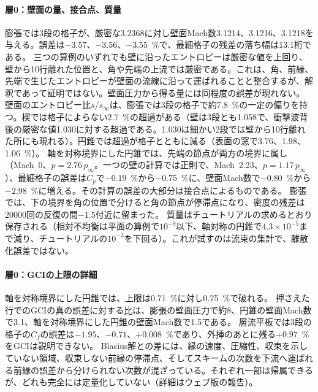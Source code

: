\documentclass[twocolumn]{labreport}
\newcommand{\Cp}{C_p}
\newcommand{\pinf}{p_\infty}
\begin{document}
\paragraph{層0：壁面の量、接合点、質量}
膨張では3段の格子が、厳密な3.2368に対し壁面Mach数3.1214、3.1216、3.1218を与える。誤差は$-3.57$、$-3.56$、$-3.55$~\%で、最細格子の残差の落ち幅は13.1桁である。
三つの算例のいずれでも壁に沿ったエントロピーは厳密な値を上回り、壁から10行離れた位置と、角や先端の上流では厳密である。これは、角、前縁、先端で生じたエントロピーが壁面の流線に沿って運ばれることと整合するが、解釈であって証明ではない。壁面圧力から得る量には同程度の誤差が現れない。
壁面のエントロピー比$s/s_\infty$は、膨張では3段の格子で約7.8~\%の一定の偏りを持つ。楔では格子によらない2.7~\%の超過がある（壁は3段とも1.058で、衝撃波背後の厳密な値1.030に対する超過である。1.030は細かい2段では壁から10行離れた所にも現れる）。円錐では超過が格子とともに減る（表面の窓で3.76、1.98、1.06~\%）。
軸を対称境界にした円錐では、先端の節点が両方の境界に属し（Mach~0、$p=2.76\,\pinf$。一つの壁の計算では正則で、Mach~2.23、$p=1.17\,\pinf$）、最細格子の誤差は$\Cp$で$-0.19$~\%から$-0.75$~\%に、壁面Mach数で$-0.80$~\%から$-2.98$~\%に増える。その計算の誤差の大部分は接合点によるものである。
膨張では、下の境界を角の位置で分けると角の節点が停滞点になり、密度の残差は20000回の反復の間$-1.5$付近に留まった。
質量はチュートリアルの求めるとおり保存される（相対不均衡は平面の算例で$10^{-9}$以下、軸対称の円錐で$4.3\times10^{-5}$まで減り、チュートリアルの$10^{-3}$を下回る）。これが試すのは流束の集計で、離散化誤差ではない。

\paragraph{層0：GCIの上限の詳細}
軸を対称境界にした円錐では、上限は0.71~\%に対し0.75~\%で破れる。
押さえた行でのGCIの真の誤差に対する比は、膨張の壁面圧力で約8、円錐の壁面Mach数で3.1、軸を対称境界にした円錐の壁面Mach数で1.5である。
層流平板では3段の格子の$C_f$の誤差は$-1.95$、$-0.71$、$+0.008$~\%であり、外挿のあとに残る$+0.97$~\%をGCIは説明できない。
Blasius解との差には、縁の速度、圧縮性、収束を示していない領域、収束しない前縁の停滞点、そしてスキームの次数を下流へ運ばれる前縁の誤差から分けられない次数が混ざっている。それぞれ一部は帰属できるが、どれも完全には定量化していない（詳細はウェブ版の報告）。
\end{document}
